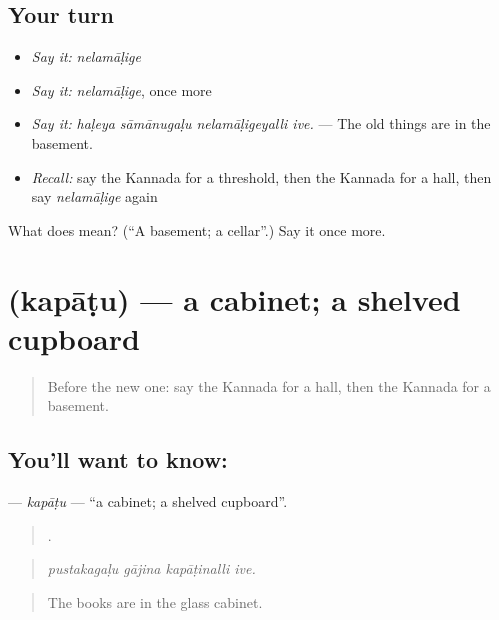 \subsection*{Your turn}
\begin{itemize}
\raggedright
  \item \emph{Say it:} \emph{nelamāḷige}
  \item \emph{Say it:} \emph{nelamāḷige}, once more
  \item \emph{Say it:} \emph{haḷeya sāmānugaḷu nelamāḷigeyalli ive.} — The old things are in the basement.
  \item \emph{Recall:} say the Kannada for a threshold, then the Kannada for a hall, then say \emph{nelamāḷige} again
\end{itemize}

\begin{tcolorbox}[breakable,colback=teal!4,colframe=teal!35!black,title={Before you move on}]
What does  mean? (\textquotedblleft{}A basement; a cellar\textquotedblright{}.) Say it once more.
\end{tcolorbox}
\section[\texorpdfstring{\kn{ಕಪಾಟು} (kapāṭu)}{ಕಪಾಟು (kapāṭu)}]{ (kapāṭu) — a cabinet; a shelved cupboard}

\label{lesson:KA-C542-kapatu}



\begin{quote}
Before the new one: say the Kannada for a hall, then the Kannada for a basement.
\end{quote}

\subsection*{You'll want to know: }
\textbf{} — \emph{kapāṭu} — \textquotedblleft{}a cabinet; a shelved cupboard\textquotedblright{}.

\begin{quote}
   .
\end{quote}

\begin{quote}
\emph{pustakagaḷu gājina kapāṭinalli ive.}
\end{quote}

\begin{quote}
The books are in the glass cabinet.
\end{quote}

